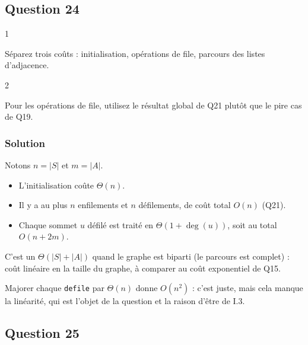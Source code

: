 \documentclass[11pt,a4paper]{article}
\providecommand{\tightlist}{\setlength{\itemsep}{0pt}\setlength{\parskip}{0pt}}
\newcommand{\equationajustee}[1]{%
  \sbox{\boiteequation}{$\displaystyle #1$}%
  \ifdim\wd\boiteequation>\linewidth
    \[\resizebox{\linewidth}{!}{\usebox{\boiteequation}}\]%
  \else
    \[#1\]%
  \fi}
\begin{document}
\hypertarget{question-24}{%
\subsection{Question 24}\label{question-24}}

\begin{indication}{1}

Séparez trois coûts : initialisation, opérations de file, parcours des listes d'adjacence.

\end{indication}

\begin{indication}{2}

Pour les opérations de file, utilisez le résultat global de Q21 plutôt que le pire cas de Q19.

\end{indication}

\hypertarget{solution-23}{%
\subsubsection{Solution}\label{solution-23}}

Notons \(n = |S|\) et \(m = |A|\).

\begin{itemize}
\tightlist
\item
  L'initialisation coûte \(\Theta(n)\).
\item
  Il y a au plus \(n\) enfilements et \(n\) défilements, de coût total \(O(n)\) (Q21).
\item
  Chaque sommet \(u\) défilé est traité en \(\Theta(1 + \deg(u))\), soit au total \(O(n + 2m)\).
\end{itemize}

\equationajustee{\boxed{\,C(\texttt{bicol}) = O(|S| + |A|)\,}}

C'est un \(\Theta(|S| + |A|)\) quand le graphe est biparti (le parcours est complet) : coût linéaire en la taille du graphe, à comparer au coût exponentiel de Q15.

\begin{piege}

Majorer chaque \texttt{defile} par \(\Theta(n)\) donne \(O(n^2)\) : c'est juste, mais cela manque la linéarité, qui est l'objet de la question et la raison d'être de I.3.

\end{piege}

\hypertarget{question-25}{%
\subsection{Question 25}\label{question-25}}
\end{document}
